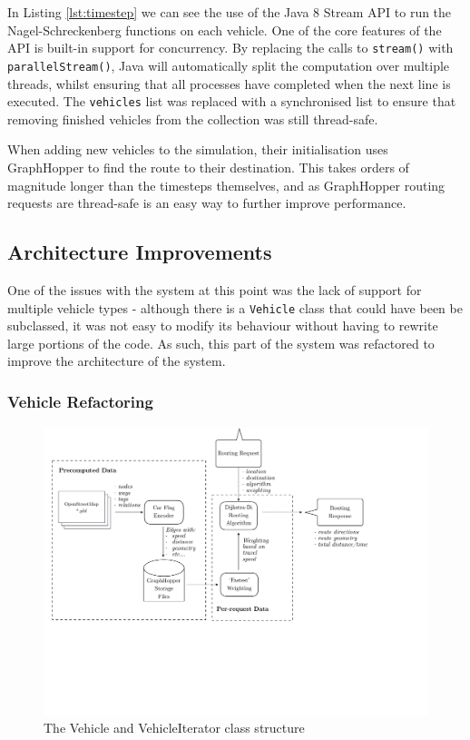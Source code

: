 \documentclass[ %
                    author={Alexander Hill},
                supervisor={Dr. Benjamin Sach},
                    degree={MEng},
                     title={MARMOSET},
                  subtitle={Multi-Agent Route Management using Online Simulation for Efficient Transportation},
                      type={research},
                      year={2016} ]{dissertation}
\begin{document}
In Listing \ref{lst:timestep} we can see the use of the Java 8 Stream API to run
the Nagel-Schreckenberg functions on each vehicle. One of the core features of
the API is built-in support for concurrency. By replacing the calls to
\texttt{stream()} with \texttt{parallelStream()}, Java will automatically split
the computation over multiple threads, whilst ensuring that all processes have
completed when the next line is executed. The \texttt{vehicles} list was
replaced with a synchronised list to ensure that removing finished vehicles from
the collection was still thread-safe.

When adding new vehicles to the simulation, their initialisation uses
GraphHopper to find the route to their destination. This takes orders of
magnitude longer than the timesteps themselves, and as GraphHopper routing
requests are thread-safe is an easy way to further improve performance.

\subsection{Architecture Improvements}

One of the issues with the system at this point was the lack of support for
multiple vehicle types - although there is a \texttt{Vehicle} class that could
have been be subclassed, it was not easy to modify its behaviour without having
to rewrite large portions of the code.  As such, this part of the system was
refactored to improve the architecture of the system.

\subsubsection{Vehicle Refactoring}

\begin{figure}[h]
    \centering
    \includegraphics[scale=0.6,page=6,clip,trim=0 11cm 8cm 0]{architecture}
    \caption{The Vehicle and VehicleIterator class structure}\label{fig:veh-arch}
\end{figure}
\end{document}
